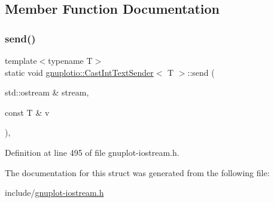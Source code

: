 \subsection{Member Function Documentation}
\mbox{\label{structgnuplotio_1_1_cast_int_text_sender_a42733f83f843a375437e7e5f716ea65e}} 
\subsubsection{\texorpdfstring{send()}{send()}}
{\footnotesize\ttfamily template$<$typename T$>$ \\
static void \hyperlink{structgnuplotio_1_1_cast_int_text_sender}{gnuplotio\+::\+Cast\+Int\+Text\+Sender}$<$ T $>$\+::send (\begin{DoxyParamCaption}\item[{std\+::ostream \&}]{stream,  }\item[{const T \&}]{v }\end{DoxyParamCaption})\hspace{0.3cm}{\ttfamily [inline]}, {\ttfamily [static]}}



Definition at line 495 of file gnuplot-\/iostream.\+h.



The documentation for this struct was generated from the following file\+:\begin{DoxyCompactItemize}
\item 
include/\hyperlink{gnuplot-iostream_8h}{gnuplot-\/iostream.\+h}\end{DoxyCompactItemize}

